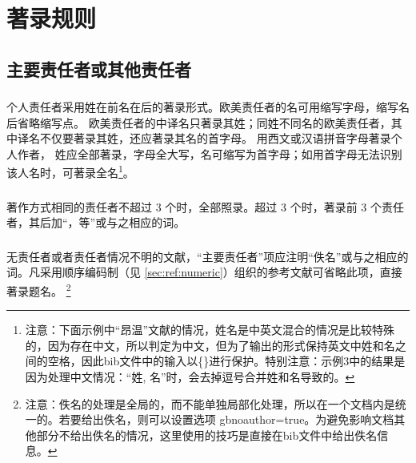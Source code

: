 \documentclass[twoside]{article}%
\begin{document}
\section{著录规则}
\subsection{主要责任者或其他责任者}
\subsubsection{} 个人责任者采用姓在前名在后的著录形式。欧美责任者的名可用缩写字母，缩写名后省略缩写点。
欧美责任者的中译名只著录其姓；同姓不同名的欧美责任者，其中译名不仅要著录其姓，还应著录其名的首字母。 用西文或汉语拼音字母著录个人作者， 姓应全部著录，字母全大写，名可缩写为首字母；如用首字母无法识别该人名时，可著录全名\footnote{注意：下面示例中“昂温”文献的情况，姓名是中英文混合的情况是比较特殊的，因为存在中文，所以判定为中文，但为了输出的形式保持英文中姓和名之间的空格，因此bib文件中的输入以\{\}进行保护。特别注意：示例3中的结果是因为处理中文情况：“姓, 名”时，会去掉逗号合并姓和名导致的。}。

\begin{refsection}

\nocite{李时珍--}
\nocite{乔纳斯--}
\nocite{昂温1988--}
\nocite{GPS1988--}
\nocite{丸山敏秋--}
\nocite{凯西尔--}
\nocite{Einstein--}
\nocite{Williams-ellis--}
\nocite{morgan--}
\nocite{lijianning--a}
\nocite{lijianning--b}

{}
\end{refsection}

\subsubsection{}  著作方式相同的责任者不超过 3 个时，全部照录。超过 3 个时，著录前 3 个责任者，其后加“，等”或与之相应的词。
\begin{refsection}
\nocite{钱学森--}
\nocite{李四光--}
\nocite{印森林--}
\nocite{fordham--}

{}
\end{refsection}

\subsubsection{} 无责任者或者责任者情况不明的文献，“主要责任者”项应注明“佚名”或与之相应的词。凡采用顺序编码制（见 \ref{sec:ref:numeric}）组织的参考文献可省略此项，直接著录题名。
\footnote{注意：佚名的处理是全局的，而不能单独局部化处理，所以在一个文档内是统一的。若要给出佚名，则可以设置选项 gbnoauthor=true。为避免影响文档其他部分不给出佚名的情况，这里使用的技巧是直接在bib文件中给出佚名信息。}
\end{document}
